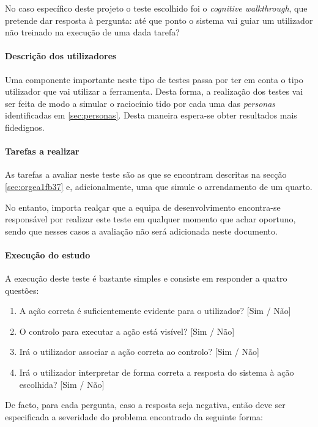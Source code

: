 No caso específico deste projeto o teste escolhido foi o \textit{cognitive
walkthrough}, que pretende dar resposta à pergunta: até que ponto o sistema
vai guiar um utilizador não treinado na execução de uma dada tarefa?

\paragraph{Descrição dos utilizadores}
\label{sec:orgf382e34}

Uma componente importante neste tipo de testes passa por ter em conta o tipo
utilizador que vai utilizar a ferramenta. Desta forma, a realização dos testes vai ser feita de modo a simular o raciocínio tido por cada uma das \textit{personas} identificadas em \ref{sec:personas}. Desta maneira espera-se obter resultados
mais fidedignos.

\paragraph{Tarefas a realizar}
\label{sec:org9167ec4}
As tarefas a avaliar neste teste são as que se encontram descritas na secção
\ref{sec:orgea1fb37} e, adicionalmente,
uma que simule o arrendamento de um quarto.

No entanto, importa realçar que a equipa de desenvolvimento encontra-se
responsável por realizar este teste em qualquer momento que achar oportuno,
sendo que nesses casos a avaliação não será adicionada neste documento.

\paragraph{Execução do estudo}
\label{sec:org18926e1}
A execução deste teste é bastante simples e consiste em responder a quatro
questões:

\begin{enumerate}
\item A ação correta é suficientemente evidente para o utilizador? [Sim / Não]
\item O controlo para executar a ação está visível? [Sim / Não]
\item Irá o utilizador associar a ação correta ao controlo? [Sim / Não]
\item Irá o utilizador interpretar de forma correta a resposta do sistema à
ação escolhida? [Sim / Não]
\end{enumerate}

De facto, para cada pergunta, caso a resposta seja negativa, então deve ser
especificada a severidade do problema encontrado da seguinte forma:

